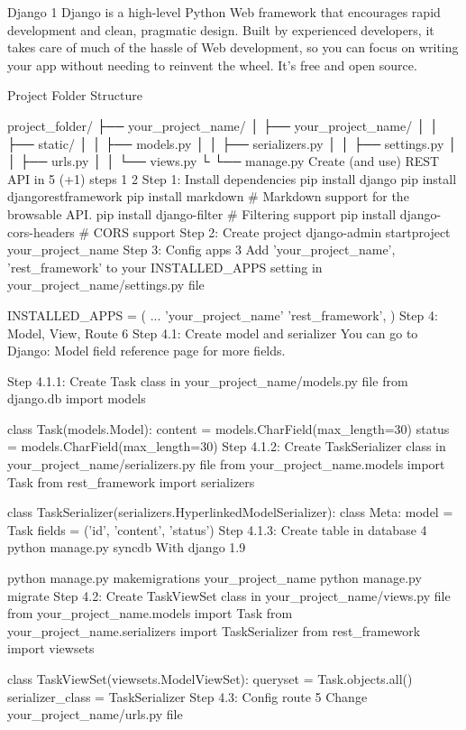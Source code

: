 Django 1
Django is a high-level Python Web framework that encourages rapid development and clean, pragmatic design. Built by experienced developers, it takes care of much of the hassle of Web development, so you can focus on writing your app without needing to reinvent the wheel. It’s free and open source.

Project Folder Structure

project_folder/
├── your_project_name/
│   ├── your_project_name/
│   │   ├── static/
│   │   ├── models.py
│   │   ├── serializers.py
│   │   ├── settings.py
│   │   ├── urls.py
│   │   └── views.py
└   └── manage.py
Create (and use) REST API in 5 (+1) steps 1 2
Step 1: Install dependencies
pip install django
pip install djangorestframework
pip install markdown             # Markdown support for the browsable API.
pip install django-filter        # Filtering support
pip install django-cors-headers  # CORS support
Step 2: Create project
django-admin startproject your_project_name
Step 3: Config apps 3
Add 'your_project_name', 'rest_framework' to your INSTALLED_APPS setting in your_project_name/settings.py file

INSTALLED_APPS = (
    ...
    'your_project_name'
    'rest_framework',
)
Step 4: Model, View, Route 6
Step 4.1: Create model and serializer
You can go to Django: Model field reference page for more fields.

Step 4.1.1: Create Task class in your_project_name/models.py file
from django.db import models

class Task(models.Model):
    content = models.CharField(max_length=30)
    status = models.CharField(max_length=30)
Step 4.1.2: Create TaskSerializer class in your_project_name/serializers.py file
from your_project_name.models import Task
from rest_framework import serializers

class TaskSerializer(serializers.HyperlinkedModelSerializer):
    class Meta:
        model = Task
        fields = ('id', 'content', 'status')
Step 4.1.3: Create table in database 4
python manage.py syncdb
With django 1.9

python manage.py makemigrations your_project_name
python manage.py migrate
Step 4.2: Create TaskViewSet class in your_project_name/views.py file
from your_project_name.models import Task
from your_project_name.serializers import TaskSerializer
from rest_framework import viewsets

class TaskViewSet(viewsets.ModelViewSet):
    queryset = Task.objects.all()
    serializer_class = TaskSerializer
Step 4.3: Config route 5
Change your_project_name/urls.py file

